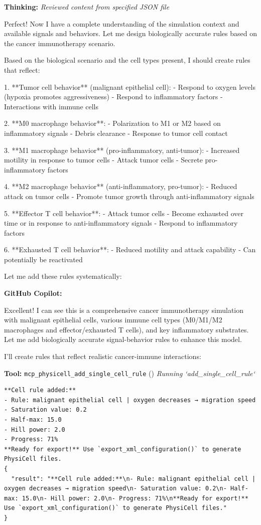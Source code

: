 \documentclass[11pt,a4paper]{article}
\begin{document}
\begin{thinkbox}
\textbf{Thinking:} \textit{Reviewed content from specified JSON file}

Perfect! Now I have a complete understanding of the simulation context and available signals and behaviors. Let me design biologically accurate rules based on the cancer immunotherapy scenario.

Based on the biological scenario and the cell types present, I should create rules that reflect:

1. **Tumor cell behavior** (malignant epithelial cell):
   - Respond to oxygen levels (hypoxia promotes aggressiveness)
   - Respond to inflammatory factors
   - Interactions with immune cells

2. **M0 macrophage behavior**:
   - Polarization to M1 or M2 based on inflammatory signals
   - Debris clearance
   - Response to tumor cell contact

3. **M1 macrophage behavior** (pro-inflammatory, anti-tumor):
   - Increased motility in response to tumor cells
   - Attack tumor cells
   - Secrete pro-inflammatory factors

4. **M2 macrophage behavior** (anti-inflammatory, pro-tumor):
   - Reduced attack on tumor cells
   - Promote tumor growth through anti-inflammatory signals

5. **Effector T cell behavior**:
   - Attack tumor cells
   - Become exhausted over time or in response to anti-inflammatory signals
   - Respond to inflammatory factors

6. **Exhausted T cell behavior**:
   - Reduced motility and attack capability
   - Can potentially be reactivated

Let me add these rules systematically:

\end{thinkbox}
\begin{copilotbox}
\textbf{GitHub Copilot:}

Excellent! I can see this is a comprehensive cancer immunotherapy simulation with malignant epithelial cells, various immune cell types (M0/M1/M2 macrophages and effector/exhausted T cells), and key inflammatory substrates. Let me add biologically accurate signal-behavior rules to enhance this model.

I'll create rules that reflect realistic cancer-immune interactions:

\end{copilotbox}
\begin{toolokbox}
\textbf{Tool:} \texttt{mcp\_physicell\_add\_single\_cell\_rule} (\checkmark)
\textit{Running `add\_single\_cell\_rule`}
\begin{lstlisting}
**Cell rule added:**
- Rule: malignant epithelial cell | oxygen decreases → migration speed
- Saturation value: 0.2
- Half-max: 15.0
- Hill power: 2.0
- Progress: 71%
**Ready for export!** Use `export_xml_configuration()` to generate PhysiCell files.
{
  "result": "**Cell rule added:**\n- Rule: malignant epithelial cell | oxygen decreases → migration speed\n- Saturation value: 0.2\n- Half-max: 15.0\n- Hill power: 2.0\n- Progress: 71%\n**Ready for export!** Use `export_xml_configuration()` to generate PhysiCell files."
}
\end{lstlisting}
\end{toolokbox}
\end{document}
